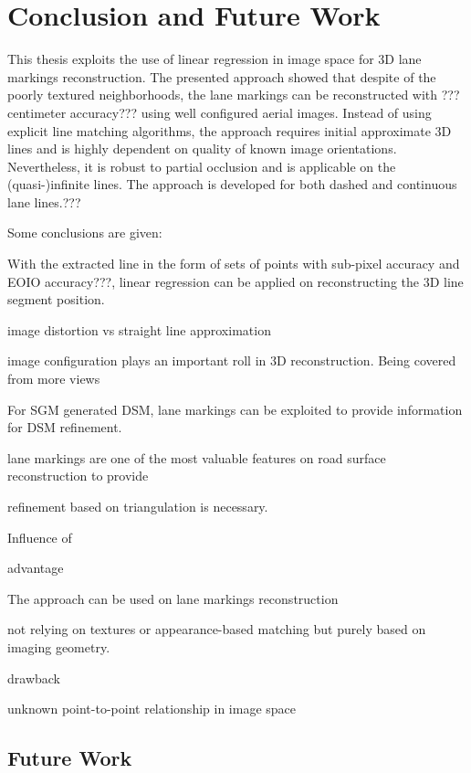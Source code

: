 
\chapter{Conclusion and Future Work}
\label{chap:conclusion}

This thesis exploits the use of linear regression in image space for 3D lane markings reconstruction. The presented approach showed that despite of the poorly textured neighborhoods, the lane markings can be reconstructed with ???centimeter accuracy??? using well configured aerial images. Instead of using explicit line matching algorithms, the approach requires initial approximate 3D lines and is highly dependent on quality of known image orientations. Nevertheless, it is robust to partial occlusion and is applicable on the (quasi-)infinite lines. %
The approach is developed for both dashed and continuous lane lines.???




Some conclusions are given:

With the extracted line in the form of sets of points with sub-pixel accuracy and EOIO accuracy???, linear regression can be applied on reconstructing the 3D line segment position.

image distortion vs straight line approximation


image configuration plays an important roll in 3D reconstruction. Being covered from more views





For SGM generated DSM, lane markings can be exploited to provide information for DSM refinement. 

lane markings are one of the most valuable features on road surface reconstruction to provide 

 refinement based on triangulation is necessary.



Influence of 


advantage

The approach can be used on lane markings reconstruction

not relying on textures or appearance-based matching
but purely based on imaging geometry.

drawback

unknown point-to-point relationship in image space




\section*{Future Work}
\label{chap:futurework}




